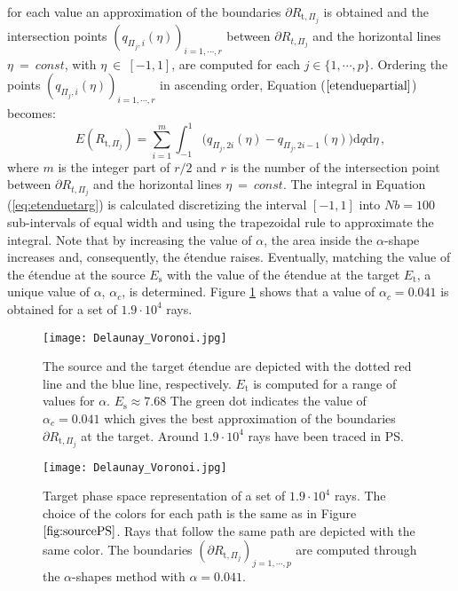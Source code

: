    for each value an approximation of the boundaries $\partial R_{\textrm{t},\Pi_j}$ is obtained and
   the intersection points $(q_{\Pi_j,i}( \eta))_{i = 1, \cdots, r}$ between $\partial R_{t,\Pi_j}$
and the horizontal lines $\eta ~=~ const$, with $\eta~\in~[-1,1]$, are computed for each $j \in \{1, \cdots, p\}$.
Ordering the points $(q_{\Pi_j,i}( \eta))_{i = 1, \cdots, r}$ in ascending order,
 Equation ($\ref{etenduepartial}$) becomes:
\begin{equation}\label{eq:etenduetarg}
 E(R_{\textrm{t}, \Pi_j}) =\sum_{i = 1}^{m} \int_{-1}^{1}{(q_{\Pi_j, 2i}( \eta)}-{q_{\Pi_j,2i-1} ( \eta) )} \textrm{d}q\textrm{d}\eta \,,
\end{equation}
where $m$ is the integer part of $r/2$ and $r$ is the number of the intersection point between $\partial R_{t,\Pi_j}$
and the horizontal lines $\eta ~=~ const$. The integral in Equation (\ref{eq:etenduetarg}) is calculated discretizing the interval $[-1, 1]$
   into $Nb=100$ sub-intervals of equal width and using the trapezoidal rule to approximate the integral.
   Note that by increasing the value of $\alpha$, the area inside the $\alpha$-shape increases and, consequently, the \'{e}tendue raises.
\noindent Eventually, matching the value of the \'{e}tendue at the source $E_{\textrm{s}}$ with the value of the \'{e}tendue at the target $E_{\textrm{t}}$, a unique value of $\alpha$, $\alpha_{c}$, is determined.
 Figure \ref{fig:etendueTS} shows that a value of $\alpha_c = 0.041$ is obtained for a set of $1.9\cdot 10^4$ rays.
 \begin{figure}[h]
  \begin{center}
  \texttt{[image: Delaunay\_Voronoi.jpg]}
  \end{center}
  \caption{\footnotesize{The source and the target \'{e}tendue are depicted with the dotted red line and the blue line, respectively.
  $E_\textrm{t}$ is computed for a range of values for $\alpha$. $E_{\textrm{s}} \approx 7.68$
   The green dot indicates the value of $\alpha_c = 0.041$ which gives the best approximation of the boundaries $\partial R_{\textrm{t}, \Pi_j}$ at the target.
   Around $1.9 \cdot 10^4$ rays have been traced in PS.
  }}
  \label{fig:etendueTS}
\end{figure}
  \begin{figure}[h]
  \begin{center}
  \texttt{[image: Delaunay\_Voronoi.jpg]}
  \end{center}
  \caption{\footnotesize{Target phase space representation of a set of $1.9 \cdot 10^4$ rays.
  The choice of the colors for each path is the same as in Figure $\ref{fig:sourcePS}$.
  Rays that follow the same path are depicted with the same color. The boundaries $(\partial R_{\textrm{t}, \Pi_j})_{j = 1, \cdots, p}$ are computed through the $\alpha$-shapes method with $\alpha = 0.041$.}}
  \label{fig:targetPS}
\end{figure}

